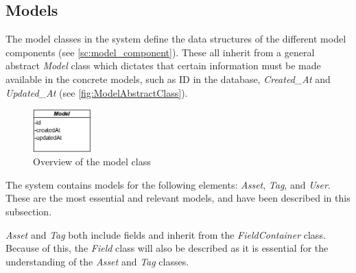 \subsection{Models}
The model classes in the system define the data structures of the different model components (see \autoref{sc:model_component}). These all inherit from a general abstract \textit{Model} class which dictates that certain information must be made available in the concrete models, such as ID in the database, \textit{Created\_At} and \textit{Updated\_At} (see \autoref{fig:ModelAbstractClass}).

\begin{figure}[H]
    \centering
    \includegraphics[width=0.2\textwidth]{figures/Implementation/Model.png}
    \caption{Overview of the model class}
    \label{fig:ModelAbstractClass}
\end{figure}

The system contains models for the following elements: \textit{Asset}, \textit{Tag}, and \textit{User}. These are the most essential and relevant models, and have been described in this subsection. 
\par
\textit{Asset} and \textit{Tag} both include fields and inherit from the \textit{FieldContainer} class. Because of this, the \textit{Field} class will also be described as it is essential for the understanding of the \textit{Asset} and \textit{Tag} classes. 